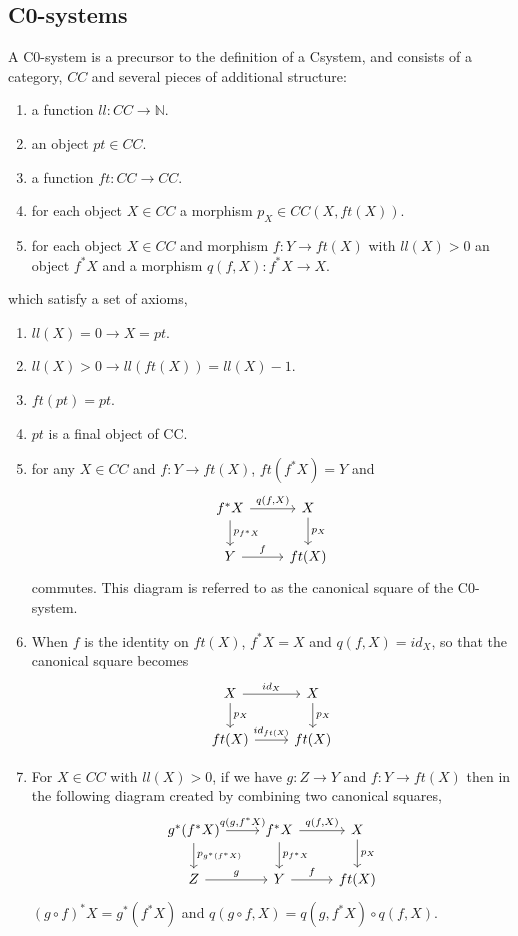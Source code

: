 \documentclass[12pt,a4paper,twoside,openright]{report}
\begin{document}
\subsection{C0-systems}
A C0-system is a precursor to the definition of a Csystem, and consists of a
category, $CC$ and several pieces of additional structure:
\begin{enumerate}
    \item a function $ll: CC\to \mathbb{N}$.
    \item an object $pt\in CC$.
    \item a function $ft: CC\to CC$.
    \item for each object $X\in CC$ a morphism $p_X\in CC(X, ft(X))$.
    \item for each object $X\in CC$ and morphism $f: Y\to ft(X)$ with $ll(X) >
    0$ an object $f^*X$ and a morphism $q(f, X) : f^*X\to X$.
\end{enumerate}
which satisfy a set of axioms,
\begin{enumerate}
    \item $ll(X) = 0 \longrightarrow X=pt$.
    \item $ll(X) > 0 \longrightarrow ll(ft(X)) = ll(X) - 1$.
    \item $ft(pt) = pt$.
    \item $pt$ is a final object of CC.
    \item for any $X\in CC$ and $f: Y\to ft(X)$, $ft(f^*X)=Y$ and
    \[
    \begin{tikzcd}
        f^*X\ar[r,"{q(f,X)}"]\ar[d,"p_{f^*X}"]&X\ar[d,"p_X"] \\
        Y\ar[r,"f"]&ft(X)
    \end{tikzcd}
    \]
    commutes. This diagram is referred to as the canonical square of the
    C0-system.
    \item When $f$ is the identity on $ft(X)$, $f^*X = X$ and $q(f, X) = id_X$,
    so that the canonical square becomes
    \[
    \begin{tikzcd}
        X\ar[r,"id_X"]\ar[d,"p_X"]&X\ar[d,"p_X"] \\
        ft(X)\ar[r,"id_{ft(X)}"]&ft(X)
    \end{tikzcd}
    \]
    \item For $X\in CC$ with $ll(X)>0$, if we have $g:Z\to Y$ and $f:Y\to ft(X)$
    then in the following diagram created by combining two canonical squares,
    \[
    \begin{tikzcd}
        g^*(f^*X)\ar[r,"{q(g, f^*X)}"]\ar[d,"p_{g^*(f^*X)}"]&
        f^*X\ar[r,"{q(f,X)}"]\ar[d,"p_{f^*X}"]&
        X\ar[d,"p_X"] \\
        Z\ar[r,"g"]&
        Y\ar[r,"f"]&
        ft(X)
    \end{tikzcd}
    \]
    $(g\circ f)^*X = g^*(f^*X)$ and $q(g\circ f, X) = q(g, f^*X)\circ q(f, X)$.
\end{enumerate}
\end{document}
